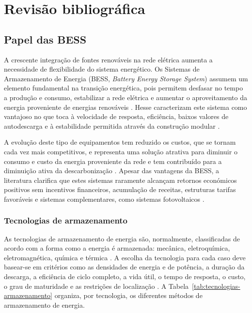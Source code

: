 
\chapter{Revisão bibliográfica}	%
\label{Chapter2}	%



\section{Papel das BESS}
\label{sec:Ch2.1}

A crescente integração de fontes renováveis na rede elétrica aumenta a necessidade de flexibilidade do sistema energético. Os Sistemas de Armazenamento de Energia (BESS, \textit{Battery Energy Storage System}) assumem um elemento fundamental na transição energética, pois permitem desfasar no tempo a produção e consumo, estabilizar a rede elétrica e aumentar o aproveitamento da energia proveniente de energias renováveis \cite{enel_bess} \cite{ Shamarova2022}. Hesse \cite{ Hesse2017} caracterizam este sistema como vantajoso no que toca à velocidade de resposta, eficiência, baixos valores de autodescarga e à estabilidade permitida através da construção modular \cite{ Hesse2017}.

A evolução deste tipo de equipamentos tem reduzido os custos, que se tornam cada vez mais competitivos, e representa uma solução atrativa para diminuir o consumo e custo da energia proveniente da rede e tem contribuído para a diminuição ativa da descarbonização \cite{enel_bess} \cite{ Shamarova2022}. Apesar das vantagens da BESS, a literatura clarifica que estes sistemas raramente alcançam retornos económicos positivos sem incentivos financeiros, acumulação de receitas, estruturas tarifas favoráveis e sistemas complementares, como sistemas fotovoltaicos \cite{ Dratsas2022}.


\subsection{Tecnologias de armazenamento }
\label{sec:Ch2.1.1}

As tecnologias de armazenamento de energia são, normalmente, classificadas de acordo com a forma como a energia é armazenada: mecânica, eletroquímica, eletromagnética, química e térmica \cite{ Balwani2021} \cite{Mahlia2014}.  A escolha da tecnologia para cada caso deve basear-se em critérios como as densidades de energia e de potência, a duração da descarga, a eficiência de ciclo completo, a vida útil, o tempo de resposta, o custo, o grau de maturidade e as restrições de localização \cite{Mahlia2014} \cite{Luo2015}. A Tabela~\ref{tab:tecnologias-armazenamento} organiza, por tecnologia, os diferentes métodos de armazenamento de energia.



